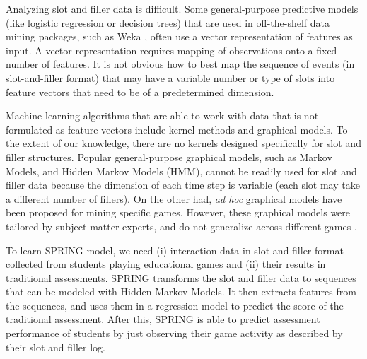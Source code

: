 \documentclass{sigchi}
\def\algname{SPRING\xspace}
\begin{document}
	
	Analyzing slot and filler data is difficult.
	Some general-purpose predictive models (like logistic regression or decision trees)  that are used in off-the-shelf data mining packages, such as Weka \cite{hall2009weka}, often use a vector representation of features as input. 
	A vector representation requires mapping of observations onto a fixed number of features.
	It is not obvious how to best map the sequence of events (in slot-and-filler format) that may have a variable number or type of slots into feature vectors  that need to be of a predetermined dimension.
	
	Machine learning algorithms that are able to work with data that is not formulated as feature vectors include kernel methods and graphical models.
	To the extent of our knowledge, there are no kernels designed specifically for slot and filler structures.
	Popular general-purpose graphical models, such as Markov Models, and Hidden Markov Models (HMM), cannot be readily used for slot and filler data because the dimension of each time step is variable (each slot may take a different number of fillers).
	On the other had,  \textit{ad hoc} graphical models have  been proposed for mining specific games.
	However, these graphical models were tailored by subject matter experts, and do not generalize across different games \cite{rowe2010integrating}.
	
	To learn \algname model, we need (i) interaction data in slot and filler format collected from students playing educational games and (ii) their results in  traditional assessments.
	\algname transforms the slot and filler data to sequences that can be modeled with Hidden Markov Models.
	It then extracts features from the sequences, and uses them in a regression model to predict the score of the traditional assessment.
	After this, \algname is able to predict assessment performance of students by just observing their game activity as described by their slot and filler log.
	

	
\end{document}
